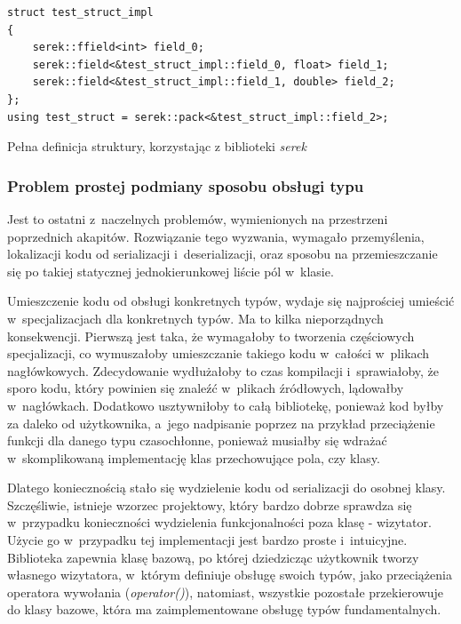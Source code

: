\documentclass[12pt]{article}
\newcommand{\n}{\newline}
\newcommand{\nonpl}[1]{{\it #1}}
\newcommand{\code}[1]{{\it #1}}
\newcommand{\serek}{\nonpl{serek}}
\begin{document}
{{{\begin{captioned}[H]
\begin{lstlisting}[frame=single]
struct test_struct_impl
{
	serek::ffield<int> field_0;
	serek::field<&test_struct_impl::field_0, float> field_1;
	serek::field<&test_struct_impl::field_1, double> field_2;
};
using test_struct = serek::pack<&test_struct_impl::field_2>;
					\end{lstlisting}
					\caption{ Pełna definicja struktury, korzystając z biblioteki \serek}
					\label{serek_full_example}
				\end{captioned}
			}

			{
				\subsubsection{Problem prostej podmiany sposobu obsługi typu}

				Jest to ostatni z~naczelnych problemów, wymienionych na przestrzeni poprzednich akapitów. Rozwiązanie tego wyzwania,
				wymagało przemyślenia, lokalizacji kodu od serializacji i~deserializacji, oraz sposobu na przemieszczanie się po takiej
				statycznej jednokierunkowej liście pól w~klasie.\n

				Umieszczenie kodu od obsługi konkretnych typów, wydaje się najprościej umieścić w~specjalizacjach dla konkretnych typów.
				Ma to kilka nieporządnych konsekwencji. Pierwszą jest taka, że wymagałoby to tworzenia częściowych specjalizacji, co
				wymuszałoby umieszczanie takiego kodu w~całości w~plikach nagłówkowych. Zdecydowanie wydłużałoby to czas kompilacji
				i~sprawiałoby, że sporo kodu, który powinien się znaleźć w~plikach źródłowych, lądowałby w~nagłówkach. Dodatkowo
				usztywniłoby to całą bibliotekę, ponieważ kod byłby za daleko od użytkownika, a~jego nadpisanie poprzez na przykład
				przeciążenie funkcji dla danego typu czasochłonne, ponieważ musiałby się wdrażać w~skomplikowaną implementację klas
				przechowujące pola, czy klasy.\n

				Dlatego koniecznością stało się wydzielenie kodu od serializacji do osobnej klasy. Szczęśliwie, istnieje wzorzec projektowy,
				który bardzo dobrze sprawdza się w~przypadku konieczności wydzielenia funkcjonalności poza klasę - wizytator\cite{visitor_description}.
				Użycie go w~przypadku tej implementacji jest bardzo proste i~intuicyjne. Biblioteka zapewnia klasę bazową, po której dziedzicząc
				użytkownik tworzy własnego wizytatora, w~którym definiuje obsługę swoich typów, jako przeciążenia operatora wywołania (\code{operator()}),
				natomiast, wszystkie pozostałe przekierowuje do klasy bazowe, która ma zaimplementowane obsługę typów fundamentalnych.\n

}}}
\end{document}
